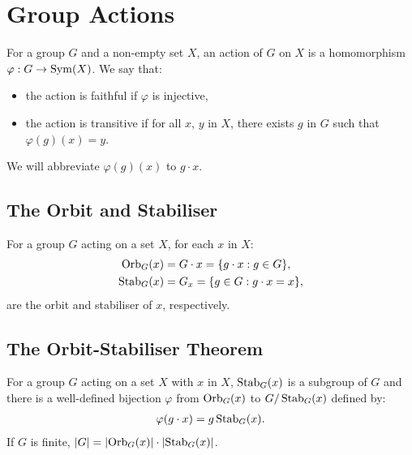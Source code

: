 \section{Group Actions}

For a group $G$ and a non-empty set $X$, an action of $G$ on $X$ is
a homomorphism $\varphi : G \to \operatorname{Sym}(X)$. We say that: \begin{itemize}
    \item the action is faithful if $\varphi$ is injective,
    \item the action is transitive if for all $x$, $y$ in $X$,
        there exists $g$ in $G$ such that $\varphi(g)(x) = y$.
\end{itemize} We will abbreviate $\varphi(g)(x)$ to $g \cdot x$.

\subsection{The Orbit and Stabiliser}

For a group $G$ acting on a set $X$, for each $x$ in $X$: \begin{align*}
    \operatorname{Orb}_G(x)  &= G \cdot x = \{g \cdot x : g \in G\}, \\
    \operatorname{Stab}_G(x) &= G_x = \{g \in G : g \cdot x = x\},
\end{align*} are the orbit and stabiliser of $x$, respectively.

\subsection{The Orbit-Stabiliser Theorem}

For a group $G$ acting on a set $X$ with $x$ in $X$, 
$\operatorname{Stab}_G(x)$ is a subgroup of $G$ and there is a
well-defined bijection $\varphi$ from $\operatorname{Orb}_G(x)$ to $G / \operatorname{Stab}_G(x)$
defined by: \begin{align*}
    \varphi(g \cdot x) = g\operatorname{Stab}_G(x).
\end{align*} If $G$ is finite, $|G| = |\!\operatorname{Orb}_G(x)| \cdot |\!\operatorname{Stab}_G(x)|$.

